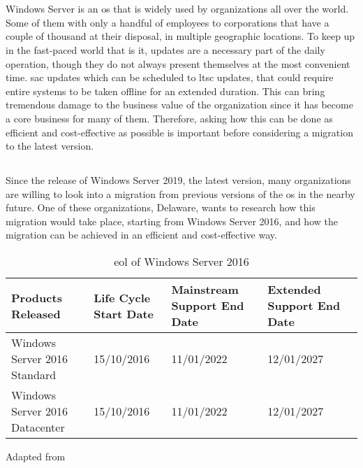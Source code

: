 \chapter{}
\label{ch:inleiding}
Windows Server is an \acrfull{os} that is widely used by organizations all over the world. 
Some of them with only a handful of employees to corporations that have a couple of thousand at their disposal, in multiple geographic locations. 
To keep up in the fast-paced world that is \acrfull{it}, updates are a necessary part of the daily operation, though they do not always present themselves at the most convenient time. 
\acrfull{sac} updates which can be scheduled to \acrfull{ltsc} updates, that could require entire systems to be taken offline for an extended duration. 
This can bring tremendous damage to the business value of the organization since \acrshort{it} has become a core business for many of them. 
Therefore, asking how this can be done as efficient and cost-effective as possible is important before considering a migration to the latest version. 

\section{}
\label{sec:probleemstelling}
Since the release of Windows Server 2019, the latest version, many organizations are willing to look into a migration from previous versions of the \acrshort{os} in the nearby future. 
One of these organizations, Delaware, wants to research how this migration would take place, starting from Windows Server 2016, and how the migration can be achieved in an efficient and cost-effective way. 

\begin{table}[htb!]
	\centering
	\begin{adjustbox}{width=1\textwidth}
		\begin{tabular}{l|l|l|ll}
			Products Released & Life Cycle Start Date & Mainstream Support End Date & Extended Support End Date &\\
			\hline
			Windows Server 2016 Standard & 15/10/2016 & 11/01/2022 & 12/01/2027 &\\
			Windows Server 2016 Datacenter & 15/10/2016 & 11/01/2022 & 12/01/2027 &\\
		\end{tabular}
	\end{adjustbox}
	\caption[\acrshort{eol} \acrshort{ws}2016]{\acrshort{eol} of Windows Server 2016}
	\scriptsize	
	Adapted from \cite{MicrosoftEOL2019}
	\label{tab:EOL2016}
\end{table}

